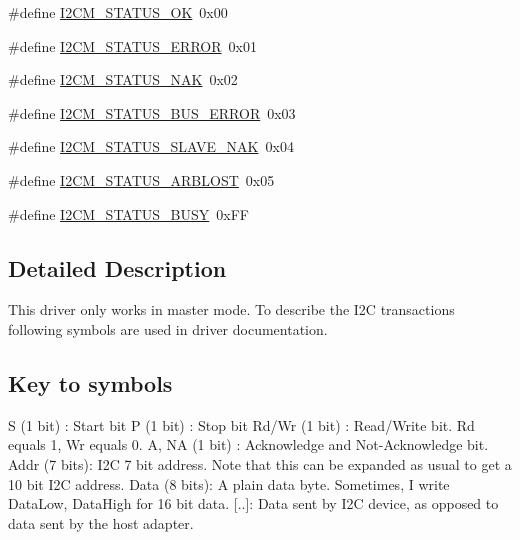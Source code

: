 \begin{DoxyCompactItemize}
\item 
\#define \hyperlink{group___i2_c_m__18_x_x__43_x_x_gaef5f7d87e3e3b72c200d978bb19205c5}{I2\+C\+M\+\_\+\+S\+T\+A\+T\+U\+S\+\_\+\+OK}~0x00
\item 
\#define \hyperlink{group___i2_c_m__18_x_x__43_x_x_ga18079f14167837fa204f54eef0c02c92}{I2\+C\+M\+\_\+\+S\+T\+A\+T\+U\+S\+\_\+\+E\+R\+R\+OR}~0x01
\item 
\#define \hyperlink{group___i2_c_m__18_x_x__43_x_x_ga3e37de80881a617b1fadceabbd9dc19f}{I2\+C\+M\+\_\+\+S\+T\+A\+T\+U\+S\+\_\+\+N\+AK}~0x02
\item 
\#define \hyperlink{group___i2_c_m__18_x_x__43_x_x_ga5ae3667cc900825fac506866f9a509d2}{I2\+C\+M\+\_\+\+S\+T\+A\+T\+U\+S\+\_\+\+B\+U\+S\+\_\+\+E\+R\+R\+OR}~0x03
\item 
\#define \hyperlink{group___i2_c_m__18_x_x__43_x_x_ga5260bc325f40a9218d0596173c996f35}{I2\+C\+M\+\_\+\+S\+T\+A\+T\+U\+S\+\_\+\+S\+L\+A\+V\+E\+\_\+\+N\+AK}~0x04
\item 
\#define \hyperlink{group___i2_c_m__18_x_x__43_x_x_ga390dc8a114c6577c494108394dad633d}{I2\+C\+M\+\_\+\+S\+T\+A\+T\+U\+S\+\_\+\+A\+R\+B\+L\+O\+ST}~0x05
\item 
\#define \hyperlink{group___i2_c_m__18_x_x__43_x_x_gafdf5fab1c97f34b2bdb9afd743822f42}{I2\+C\+M\+\_\+\+S\+T\+A\+T\+U\+S\+\_\+\+B\+U\+SY}~0x\+FF
\end{DoxyCompactItemize}


\subsection{Detailed Description}
This driver only works in master mode. To describe the I2C transactions following symbols are used in driver documentation.

\subsection*{Key to symbols }

S (1 bit) \+: Start bit P (1 bit) \+: Stop bit Rd/\+Wr (1 bit) \+: Read/\+Write bit. Rd equals 1, Wr equals 0. A, NA (1 bit) \+: Acknowledge and Not-\/\+Acknowledge bit. Addr (7 bits)\+: I2C 7 bit address. Note that this can be expanded as usual to get a 10 bit I2C address. Data (8 bits)\+: A plain data byte. Sometimes, I write Data\+Low, Data\+High for 16 bit data. \mbox{[}..\mbox{]}\+: Data sent by I2C device, as opposed to data sent by the host adapter. 

